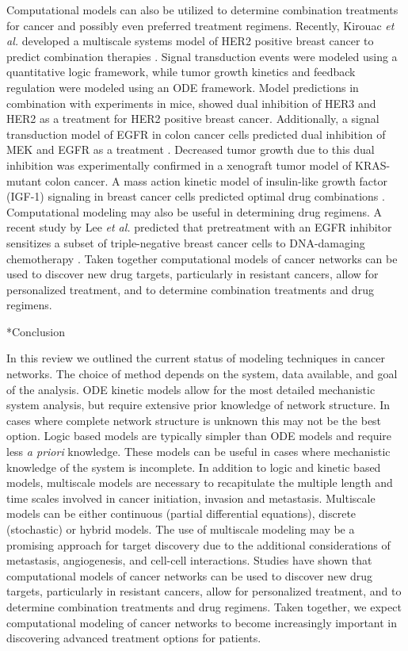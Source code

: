\documentclass[12pt]{article}
\makeatletter
\renewcommand\section{\@startsection
	{subsection}{2}{0mm}
	{-0.2in}
	{0.05\baselineskip}
	{\normalfont\large\bfseries}}
\makeatother
\begin{document}
Computational models can also be utilized to determine combination treatments for cancer and possibly even preferred treatment regimens. Recently, Kirouac \textit{et al.} developed a multiscale systems model of HER2 positive breast cancer to predict combination therapies \cite{Kirouac2013}. Signal transduction events were modeled using a quantitative logic framework, while tumor growth kinetics and feedback regulation were modeled using an ODE framework. Model predictions in combination with experiments in mice, showed dual inhibition of HER3 and HER2 as a treatment for HER2 positive breast cancer. Additionally, a signal transduction model of EGFR in colon cancer cells predicted dual inhibition of MEK and EGFR as a treatment \cite{Klinger2013}. Decreased tumor growth due to this dual inhibition was experimentally confirmed in a xenograft tumor model of KRAS-mutant colon cancer. A mass action kinetic model of insulin-like growth factor (IGF-1) signaling in breast cancer cells predicted optimal drug combinations \cite{Iadevaia2010}. Computational modeling may also be useful in determining drug regimens. A recent study by Lee \textit{et al.} predicted that pretreatment with an EGFR inhibitor sensitizes a subset of triple-negative breast cancer cells to DNA-damaging chemotherapy \cite{Lee2012}. 
Taken together computational models of cancer networks can be used to discover new drug targets, particularly in resistant cancers, allow for personalized treatment, and to determine combination treatments and drug regimens.

\section*{Conclusion}

In this review we outlined the current status of modeling techniques in cancer networks. 
The choice of method depends on the system, data available, and goal of the analysis. 
ODE kinetic models allow for the most detailed mechanistic system analysis, but require extensive prior knowledge of network structure. 
In cases where complete network structure is unknown this may not be the best option. 
Logic based models are typically simpler than ODE models and require less \textit{a priori} knowledge.
These models can be useful in cases where mechanistic knowledge of the system is incomplete.
In addition to logic and kinetic based models, multiscale models are necessary to recapitulate the multiple length and time scales involved in cancer initiation, invasion and metastasis.
Multiscale models can be either continuous (partial differential equations), discrete (stochastic) or hybrid models.
The use of multiscale modeling may be a promising approach for target discovery due to the additional considerations of metastasis, angiogenesis, and cell-cell interactions. 
Studies have shown that computational models of cancer networks can be used to discover new drug targets, particularly in resistant cancers, allow for personalized treatment, and to determine combination treatments and drug regimens.
Taken together, we expect computational modeling of cancer networks to become increasingly important in discovering advanced treatment options for patients. 
\end{document}
